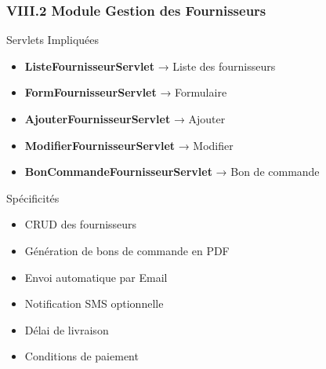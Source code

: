\documentclass[11pt, aspectratio=169]{beamer}
\begin{document}
\begin{frame}
    \frametitle{VIII.2 Module Gestion des Fournisseurs}
    
    \begin{block}{Servlets Impliquées}
        \begin{itemize}
            \item[\faList] \textbf{ListeFournisseurServlet} → Liste des fournisseurs
            \item[\faWrench] \textbf{FormFournisseurServlet} → Formulaire
            \item[\faPlus] \textbf{AjouterFournisseurServlet} → Ajouter
            \item[\faEdit] \textbf{ModifierFournisseurServlet} → Modifier
            \item[\faFileContract] \textbf{BonCommandeFournisseurServlet} → Bon de commande
        \end{itemize}
    \end{block}
    
    \vspace{0.8cm}
    
    \begin{block}{Spécificités}
        \begin{itemize}
            \item CRUD des fournisseurs
            \item Génération de bons de commande en PDF
            \item Envoi automatique par Email
            \item Notification SMS optionnelle
            \item Délai de livraison
            \item Conditions de paiement
        \end{itemize}
    \end{block}
\end{frame}
\end{document}
